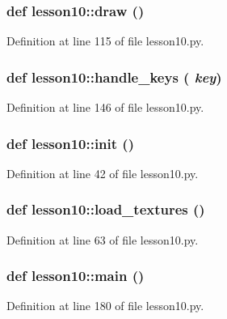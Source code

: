 \subsubsection{\setlength{\rightskip}{0pt plus 5cm}def lesson10::draw ()}\label{namespacelesson10_699780cf9af683a2d6e1fc703bc37fb5}




Definition at line 115 of file lesson10.py.
\subsubsection{\setlength{\rightskip}{0pt plus 5cm}def lesson10::handle\_\-keys ( {\em key})}\label{namespacelesson10_b3318f130b9b363aff6a92b3cefc1f41}




Definition at line 146 of file lesson10.py.
\subsubsection{\setlength{\rightskip}{0pt plus 5cm}def lesson10::init ()}\label{namespacelesson10_7c4e7f3e801595bb17bc0c8550ab9081}




Definition at line 42 of file lesson10.py.
\subsubsection{\setlength{\rightskip}{0pt plus 5cm}def lesson10::load\_\-textures ()}\label{namespacelesson10_7873b1e7aa2bf09d3b2ab06c5abafa22}




Definition at line 63 of file lesson10.py.
\subsubsection{\setlength{\rightskip}{0pt plus 5cm}def lesson10::main ()}\label{namespacelesson10_391a1a38c0fdbd9989b44c6017706599}




Definition at line 180 of file lesson10.py.
